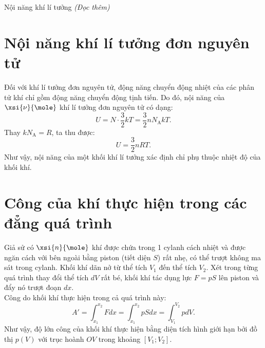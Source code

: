 \begin{dang}{Nội năng khí lí tưởng \textit{(Đọc thêm)}}
\setcounter{section}{0}
\section{Nội năng khí lí tưởng đơn nguyên tử}
Đối với khí lí tưởng đơn nguyên tử, động năng chuyển động nhiệt của các phân tử khí chỉ gồm động năng chuyển động tịnh tiến. Do đó, nội năng của $\xsi{\nu}{\mole}$ khí lí tưởng đơn nguyên tử có dạng:
$$U=N\cdot\dfrac{3}{2}kT=\dfrac{3}{2}n N_\text{A}kT.$$
Thay $kN_\text{A}=R$, ta thu được:
$$U=\dfrac{3}{2}n RT.$$
Như vậy, nội năng của một khối khí lí tưởng xác định chỉ phụ thuộc nhiệt độ của khối khí.
\section{Công của khí thực hiện trong các đẳng quá trình}
Giả sử có $\xsi{n}{\mole}$ khí được chứa trong 1 cylanh cách nhiệt và được ngăn cách với bên ngoài bằng piston (tiết diện $S$) rất nhẹ, có thể trượt không ma sát trong cylanh. Khối khí dãn nở từ thể tích $V_1$ đến thể tích $V_2$. Xét trong từng quá trình thay đổi thể tích $dV$ rất bé, khối khí tác dụng lực $F=pS$ lên piston và đẩy nó trượt đoạn $dx$.\\
Công do khối khí thực hiện trong cả quá trình này:
$$A'=\int_{x_1}^{x_2} Fdx=\int_{x_1}^{x_2} pSdx=\int_{V_1}^{V_2}pdV.$$
Như vậy, độ lớn công của khối khí thực hiện bằng diện tích hình giới hạn bởi đồ thị $p\left(V\right)$ với trục hoành $OV$ trong khoảng $\left[V_1; V_2\right]$.\\
\begin{minipage}{0.45\textwidth}

\end{minipage}
\end{dang}
